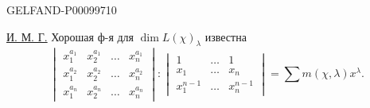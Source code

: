 \begin{GelfandAdjacentEvidence}{GELFAND-P000997}{10}


\underline{И. М. Г.} Хорошая ф-я для $\dim L(\chi)_\lambda$ известна
\[
\begin{vmatrix}
x_1^{a_1}&x_2^{a_1}&\ldots&x_n^{a_1}\\
x_1^{a_2}&x_2^{a_2}&\ldots&x_n^{a_2}\\
x_1^{a_n}&x_2^{a_n}&\ldots&x_n^{a_n}
\end{vmatrix}
:
\begin{vmatrix}
1&\ldots&1\\
x_1&\ldots&x_n\\
x_1^{n-1}&\ldots&x_n^{n-1}
\end{vmatrix}
=\sum m(\chi,\lambda)x^\lambda.
\]
\end{GelfandAdjacentEvidence}



